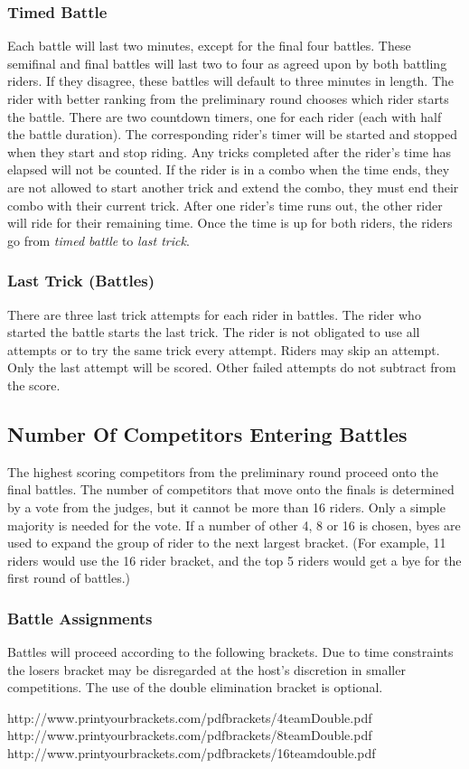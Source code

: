 \subsubsection{Timed Battle}
Each battle will last two minutes, except for the final four battles.
These semifinal and final battles will last two to four as agreed upon by both battling riders.
If they disagree, these battles will default to three minutes in length.
The rider with better ranking from the preliminary round chooses which rider starts the battle.
There are two countdown timers, one for each rider (each with half the battle duration).
The corresponding rider's timer will be started and stopped when they start and stop riding.
Any tricks completed after the rider's time has elapsed will not be counted.
If the rider is in a combo when the time ends, they are not allowed to start another trick and extend the combo, they must end their combo with their current trick.
After one rider's time runs out, the other rider will ride for their remaining time.
Once the time is up for both riders, the riders go from \textit{timed battle} to \textit{last trick}.

\subsubsection{Last Trick (Battles)}
There are three last trick attempts for each rider in battles.
The rider who started the battle starts the last trick.
The rider is not obligated to use all attempts or to try the same trick every attempt.
Riders may skip an attempt.
Only the last attempt will be scored.
Other failed attempts do not subtract from the score.

\subsection{Number Of Competitors Entering Battles}
The highest scoring competitors from the preliminary round proceed onto the final battles.
The number of competitors that move onto the finals is determined by a vote from the judges, but it cannot be more than 16 riders.
Only a simple majority is needed for the vote.
If a number of other 4, 8 or 16 is chosen, byes are used to expand the group of rider to the next largest bracket.
(For example, 11 riders would use the 16 rider bracket, and the top 5 riders would get a bye for the first round of battles.)

\subsubsection{Battle Assignments}
Battles will proceed according to the following brackets.
Due to time constraints the losers bracket may be disregarded at the host's discretion in smaller competitions.
The use of the double elimination bracket is optional.

http://www.printyourbrackets.com/pdfbrackets/4teamDouble.pdf \\
http://www.printyourbrackets.com/pdfbrackets/8teamDouble.pdf \\
http://www.printyourbrackets.com/pdfbrackets/16teamdouble.pdf
